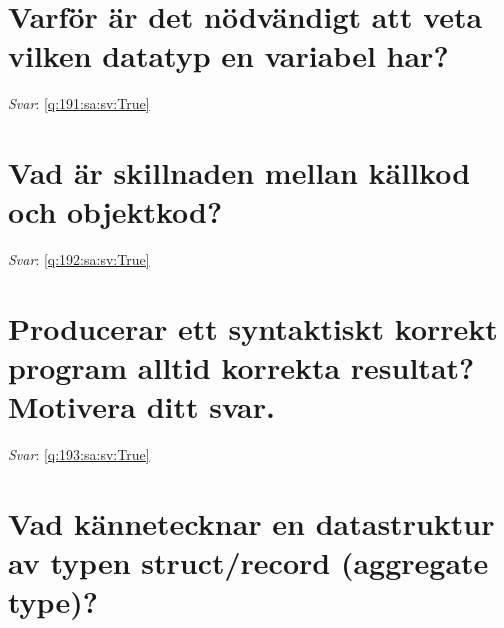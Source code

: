 \documentclass[a4paper,11pt,oneside]{book}
\begin{document}
\begin{sloppypar}
\section{Varf\"or \"ar det n\"odv\"andigt att veta vilken datatyp en variabel har?}

\label{q:191:sa:sv:False}

\vspace{2cm}

\noindent\makebox[\textwidth]{\hrulefill}

\vspace{1cm}

\textit{Svar}: \autoref{q:191:sa:sv:True}



\section{Vad \"ar skillnaden mellan k\"allkod och objektkod?}

\label{q:192:sa:sv:False}

\vspace{2cm}

\noindent\makebox[\textwidth]{\hrulefill}

\vspace{1cm}

\textit{Svar}: \autoref{q:192:sa:sv:True}



\section{Producerar ett syntaktiskt korrekt program alltid korrekta resultat? Motivera ditt svar.}

\label{q:193:sa:sv:False}

\vspace{2cm}

\noindent\makebox[\textwidth]{\hrulefill}

\vspace{1cm}

\textit{Svar}: \autoref{q:193:sa:sv:True}



\section{Vad k\"annetecknar en datastruktur av typen struct/record (aggregate type)?}

\label{q:194:sa:sv:False}

\vspace{2cm}


\end{sloppypar}
\end{document}
